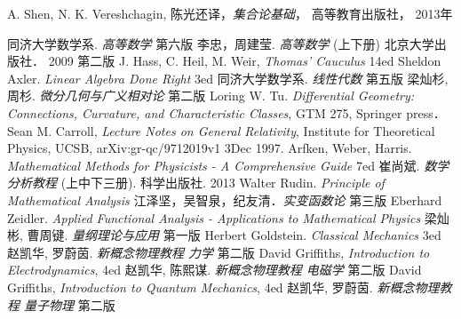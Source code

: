 \begin{thebibliography}{99}
A. Shen, N. K. Vereshchagin, 陈光还译，\textsl{集合论基础}， 高等教育出版社， 2013年
$$ $$

同济大学数学系. \textsl{高等数学} 第六版
李忠，周建莹. \textsl{高等数学} (上下册) 北京大学出版社． 2009 第二版
J. Hass, C. Heil, M. Weir, \textsl{Thomas' Cauculus} 14ed
Sheldon Axler. \textsl{Linear Algebra Done Right} 3ed
同济大学数学系. \textsl{线性代数} 第五版
梁灿杉, 周杉. \textsl{微分几何与广义相对论} 第二版
Loring W. Tu. \textsl{Differential Geometry: Connections, Curvature, and Characteristic Classes}, GTM 275, Springer press．
Sean M. Carroll, \textsl{Lecture Notes on General Relativity}, Institute for Theoretical Physics, UCSB, arXiv:gr-qc/9712019v1 3Dec 1997. 
Arfken, Weber, Harris. \textsl{Mathematical Methods for Physicists - A Comprehensive Guide} 7ed
崔尚斌. \textsl{数学分析教程} (上中下三册). 科学出版社. 2013
Walter Rudin. \textsl{Principle of Mathematical Analysis}
江泽坚，吴智泉，纪友清．\textsl{实变函数论} 第三版
Eberhard Zeidler. \textsl{Applied Functional Analysis - Applications to Mathematical Physics}
梁灿彬, 曹周键. \textsl{量纲理论与应用} 第一版
Herbert Goldstein. \textsl{Classical Mechanics} 3ed
赵凯华, 罗蔚茵. \textsl{新概念物理教程 力学} 第二版
David Griffiths, \textsl{Introduction to Electrodynamics}, 4ed
赵凯华, 陈熙谋. \textsl{新概念物理教程 电磁学} 第二版
David Griffiths, \textsl{Introduction to Quantum Mechanics}, 4ed
赵凯华, 罗蔚茵. \textsl{新概念物理教程 量子物理} 第二版

\end{thebibliography}
